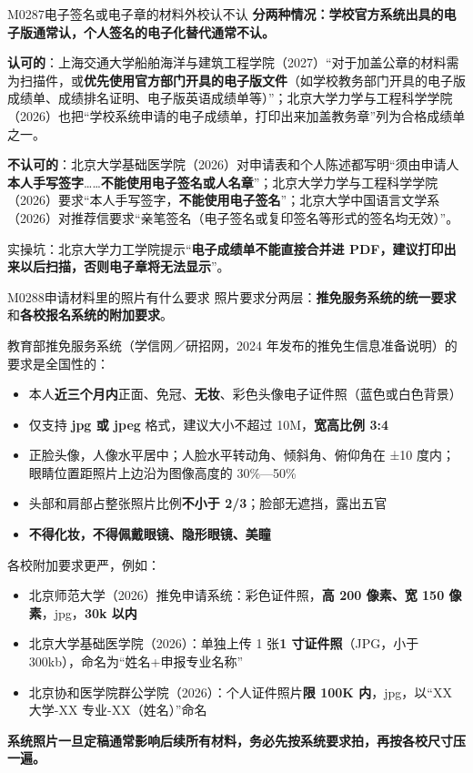 \begin{qa}{M0287}{电子签名或电子章的材料外校认不认}
\textbf{分两种情况：学校官方系统出具的电子版通常认，个人签名的电子化替代通常不认。}

\textbf{认可的}：上海交通大学船舶海洋与建筑工程学院（2027）“对于加盖公章的材料需为扫描件，或\textbf{优先使用官方部门开具的电子版文件}（如学校教务部门开具的电子版成绩单、成绩排名证明、电子版英语成绩单等）”；北京大学力学与工程科学学院（2026）也把“学校系统申请的电子成绩单，打印出来加盖教务章”列为合格成绩单之一。

\textbf{不认可的}：北京大学基础医学院（2026）对申请表和个人陈述都写明“须由申请人\textbf{本人手写签字}……\textbf{不能使用电子签名或人名章}”；北京大学力学与工程科学学院（2026）要求“本人手写签字，\textbf{不能使用电子签名}”；北京大学中国语言文学系（2026）对推荐信要求“亲笔签名（电子签名或复印签名等形式的签名均无效）”。

实操坑：北京大学力工学院提示“\textbf{电子成绩单不能直接合并进 PDF，建议打印出来以后扫描，否则电子章将无法显示}”。
\end{qa}

\begin{qa}{M0288}{申请材料里的照片有什么要求}
照片要求分两层：\textbf{推免服务系统的统一要求}和\textbf{各校报名系统的附加要求}。

教育部推免服务系统（学信网／研招网，2024 年发布的推免生信息准备说明）的要求是全国性的：

\begin{itemize}
  \item 本人\textbf{近三个月内}正面、免冠、\textbf{无妆}、彩色头像电子证件照（蓝色或白色背景）
  \item 仅支持 \textbf{jpg 或 jpeg} 格式，建议大小不超过 10M，\textbf{宽高比例 3:4}
  \item 正脸头像，人像水平居中；人脸水平转动角、倾斜角、俯仰角在 ±10 度内；眼睛位置距照片上边沿为图像高度的 30\%—50\%
  \item 头部和肩部占整张照片比例\textbf{不小于 2/3}；脸部无遮挡，露出五官
  \item \textbf{不得化妆，不得佩戴眼镜、隐形眼镜、美瞳}
\end{itemize}

各校附加要求更严，例如：

\begin{itemize}
  \item 北京师范大学（2026）推免申请系统：彩色证件照，\textbf{高 200 像素、宽 150 像素}，jpg，\textbf{30k 以内}
  \item 北京大学基础医学院（2026）：单独上传 1 张\textbf{1 寸证件照}（JPG，小于 300kb），命名为“姓名+申报专业名称”
  \item 北京协和医学院群公学院（2026）：个人证件照片\textbf{限 100K 内}，jpg，以“XX 大学-XX 专业-XX（姓名）”命名
\end{itemize}

\textbf{系统照片一旦定稿通常影响后续所有材料，务必先按系统要求拍，再按各校尺寸压一遍。}
\end{qa}

